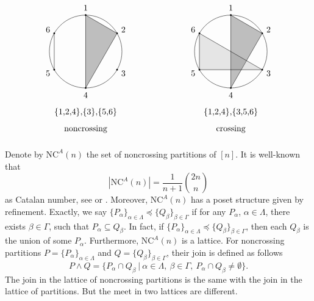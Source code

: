 \documentclass[a4paper, 11pt, reqno]{amsart}
\numberwithin{equation}{section}
\theoremstyle{remark}
\theoremstyle{definition}
\begin{document}
\[
\begin{tikzpicture}
\begin{scope}[xshift=-3cm]
\draw (0,0) circle (1.5);
\node (a) at (90:1.8) {1};
\node (b) at (30:1.8) {2};
\node (c) at (-30:1.8) {3};
\node (d) at (-90:1.8) {4};
\node (e) at (-150:1.8) {5};
\node (f) at (150:1.8) {6};
\node (g) at (-90:2.5) {\{1,2,4\},\{3\},\{5,6\}};
\node (h) at (-90:3.2) {noncrossing};
\fill (90:1.5) circle (1pt);
\fill (30:1.5) circle (1pt);
\fill (-30:1.5) circle (1pt);
\fill (-90:1.5) circle (1pt);
\fill (-150:1.5) circle (1pt);
\fill (150:1.5) circle (1pt);
\filldraw[fill=gray, fill opacity=0.5] (90:1.5) to (30:1.5) to (-90:1.5) to (90:1.5);
\draw (150:1.5) to (-150:1.5);
\end{scope}
\begin{scope}[xshift=3cm]
\draw (0,0) circle (1.5);
\node (a) at (90:1.8) {1};
\node (b) at (30:1.8) {2};
\node (c) at (-30:1.8) {3};
\node (d) at (-90:1.8) {4};
\node (e) at (-150:1.8) {5};
\node (f) at (150:1.8) {6};
\node (g) at (-90:2.5) {\{1,2,4\},\{3,5,6\}};
\node (h) at (-90:3.2) {crossing};
\fill (90:1.5) circle (1pt);
\fill (30:1.5) circle (1pt);
\fill (-30:1.5) circle (1pt);
\fill (-90:1.5) circle (1pt);
\fill (-150:1.5) circle (1pt);
\fill (150:1.5) circle (1pt);
\filldraw[fill=gray, fill opacity=0.5] (90:1.5) to (30:1.5) to (-90:1.5) to (90:1.5);
\filldraw[fill=gray, fill opacity=0.2] (150:1.5) to (-150:1.5) to (-30:1.5) to (150:1.5);
\end{scope}
\end{tikzpicture}
\]

Denote by $\mathrm{NC}^A(n)$ the set of noncrossing partitions of $[n]$. It is well-known that 
\[
   |\mathrm{NC}^A(n)|=\frac{1}{n+1}\binom{2n}{n}
\]
as Catalan number, see \cite[Corollary~4.2]{kreweras1972partitions} or \cite[Theorem~4.1.2]{armstrong2009generalized}. Moreover, $\mathrm{NC}^A(n)$ has a poset structure given by refinement. Exactly, we say $\{P_\alpha \}_{\alpha \in \Lambda} \preceq \{Q_\beta \}_{\beta \in \Gamma}$ if for any $P_\alpha$, $\alpha \in \Lambda$, there exists $\beta \in \Gamma$, such that $P_\alpha \subseteq Q_\beta$. In fact, if $\{P_\alpha \}_{\alpha \in \Lambda} \preceq \{Q_\beta \}_{\beta \in \Gamma}$, then each $Q_\beta$ is the union of some $P_\alpha$. Furthermore, $\mathrm{NC}^A(n)$ is a lattice. For noncrossing partitions $P=\{P_\alpha \}_{\alpha \in \Lambda}$ and $Q=\{Q_\beta \}_{\beta \in \Gamma}$, their join is defined as follows
\[
P \wedge Q=\{P_\alpha \cap Q_\beta \ | \ \alpha \in \Lambda, \ \beta \in \Gamma, \ P_\alpha \cap Q_\beta \neq \emptyset \}.
\]
The join in the lattice of noncrossing partitions is the same with the join in the lattice of partitions. But the meet in two lattices are different.
\end{document}
